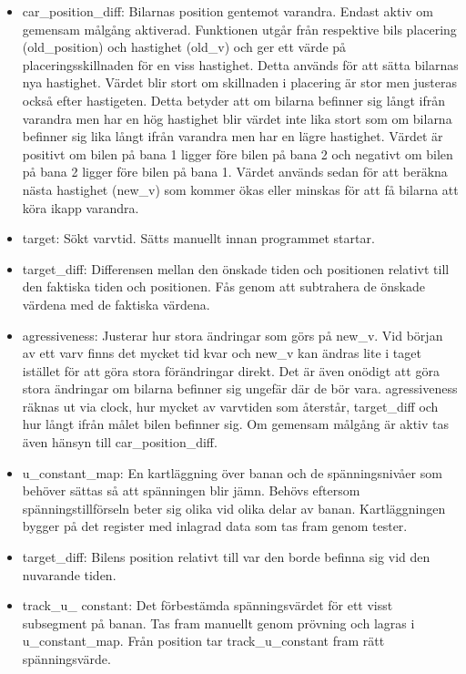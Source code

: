 \begin{itemize}
      \item car\_position\_diff: Bilarnas position gentemot varandra. Endast aktiv om gemensam målgång aktiverad. Funktionen utgår från respektive bils placering (old\_position) och hastighet (old\_v)
och ger ett värde på placeringsskillnaden för en viss hastighet. Detta används för att sätta bilarnas nya hastighet. Värdet blir stort om skillnaden i placering är stor men justeras också efter hastigeten. Detta betyder att om bilarna befinner sig långt ifrån varandra men har en hög hastighet blir värdet inte lika stort som om bilarna befinner sig lika långt ifrån varandra men har en lägre hastighet. Värdet är positivt om bilen på bana 1 ligger före bilen på bana 2 och negativt om bilen på bana 2 ligger före bilen på bana 1.
Värdet används sedan för att beräkna nästa hastighet (new\_v) som kommer ökas eller minskas för att få bilarna att köra ikapp varandra. 

      \item target: Sökt varvtid. Sätts manuellt innan programmet startar.
      \item target\_diff: Differensen mellan den önskade tiden och positionen relativt till den faktiska tiden och positionen. Fås genom att subtrahera de önskade värdena med de faktiska värdena. 
 
      \item agressiveness: Justerar hur stora ändringar som görs på new\_v. Vid början av ett varv finns det mycket tid kvar och new\_v kan ändras lite i taget istället för att göra stora förändringar direkt. Det är även onödigt att göra stora ändringar om bilarna befinner sig ungefär där de bör vara. agressiveness räknas ut via clock, hur mycket av varvtiden som återstår, target\_diff och hur långt ifrån målet bilen befinner sig. Om gemensam målgång är aktiv tas även hänsyn till car\_position\_diff.

      \item u\_constant\_map: En kartläggning över banan och de spänningsnivåer som behöver sättas så att spänningen blir jämn. Behövs eftersom spänningstillförseln beter sig olika vid olika delar av banan. Kartläggningen bygger på det register med inlagrad data som tas fram genom tester.
      \item target\_diff: Bilens position relativt till var den borde befinna sig vid den nuvarande tiden.
      
\item track\_u\_ constant: Det förbestämda spänningsvärdet för ett visst subsegment på banan. Tas fram manuellt genom prövning och lagras i u\_constant\_map. Från position tar track\_u\_constant fram rätt spänningsvärde.
     

\end{itemize}
